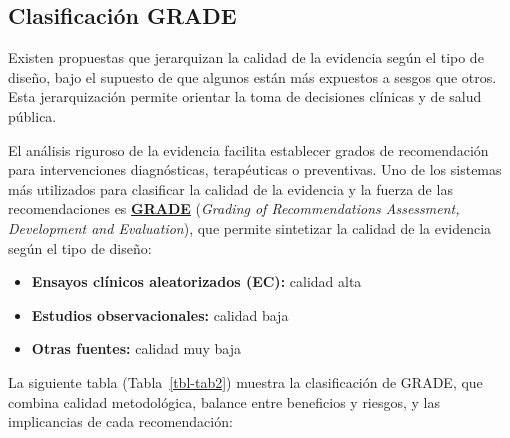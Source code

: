 \documentclass[
  spanish,
  a4paper,
]{scrbook}
\begin{document}
\subsection{Clasificación GRADE}\label{clasificaciuxf3n-grade}

Existen propuestas que jerarquizan la calidad de la evidencia según el
tipo de diseño, bajo el supuesto de que algunos están más expuestos a
sesgos que otros. Esta jerarquización permite orientar la toma de
decisiones clínicas y de salud pública.

El análisis riguroso de la evidencia facilita establecer grados de
recomendación para intervenciones diagnósticas, terapéuticas o
preventivas. Uno de los sistemas más utilizados para clasificar la
calidad de la evidencia y la fuerza de las recomendaciones es
\href{https://www.gradeworkinggroup.org/}{\textbf{GRADE}} (\emph{Grading
of Recommendations Assessment, Development and Evaluation}), que permite
sintetizar la calidad de la evidencia según el tipo de diseño:

\begin{itemize}
\item
  \textbf{Ensayos clínicos aleatorizados (EC):} calidad alta
\item
  \textbf{Estudios observacionales:} calidad baja
\item
  \textbf{Otras fuentes:} calidad muy baja
\end{itemize}

La siguiente tabla (Tabla~\ref{tbl-tab2}) muestra la clasificación de
GRADE, que combina calidad metodológica, balance entre beneficios y
riesgos, y las implicancias de cada recomendación:
\end{document}
